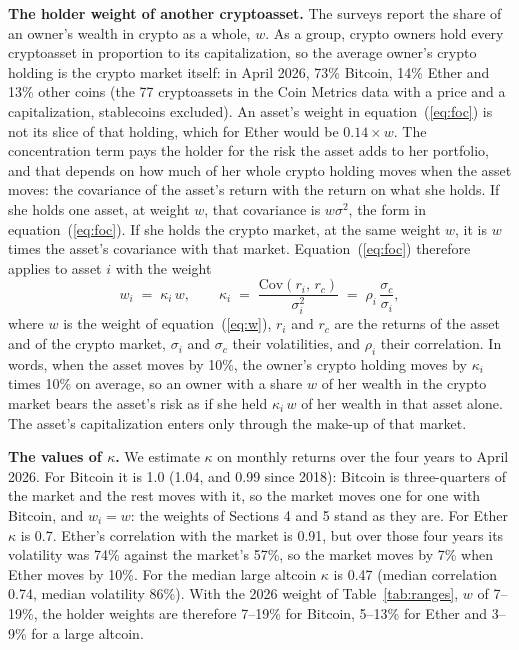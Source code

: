 \documentclass[11pt]{article}
\begin{document}
\textbf{The holder weight of another cryptoasset.} The surveys report the share of an owner's wealth in crypto as a whole, $w$. As a group, crypto owners hold every cryptoasset in proportion to its capitalization, so the average owner's crypto holding is the crypto market itself: in April 2026, 73\% Bitcoin, 14\% Ether and 13\% other coins (the 77 cryptoassets in the Coin Metrics data with a price and a capitalization, stablecoins excluded). An asset's weight in equation~(\ref{eq:foc}) is not its slice of that holding, which for Ether would be $0.14 \times w$. The concentration term pays the holder for the risk the asset adds to her portfolio, and that depends on how much of her whole crypto holding moves when the asset moves: the covariance of the asset's return with the return on what she holds. If she holds one asset, at weight $w$, that covariance is $w\sigma^2$, the form in equation~(\ref{eq:foc}). If she holds the crypto market, at the same weight $w$, it is $w$ times the asset's covariance with that market. Equation~(\ref{eq:foc}) therefore applies to asset $i$ with the weight
\begin{equation}
w_i \;=\; \kappa_i\,w, \qquad \kappa_i \;=\; \frac{\mathrm{Cov}(r_i,\, r_c)}{\sigma_i^{2}} \;=\; \rho_i\,\frac{\sigma_c}{\sigma_i},
\label{eq:kappa}
\end{equation}
where $w$ is the weight of equation~(\ref{eq:w}), $r_i$ and $r_c$ are the returns of the asset and of the crypto market, $\sigma_i$ and $\sigma_c$ their volatilities, and $\rho_i$ their correlation. In words, when the asset moves by 10\%, the owner's crypto holding moves by $\kappa_i$ times 10\% on average, so an owner with a share $w$ of her wealth in the crypto market bears the asset's risk as if she held $\kappa_i\,w$ of her wealth in that asset alone. The asset's capitalization enters only through the make-up of that market.

\textbf{The values of $\kappa$.} We estimate $\kappa$ on monthly returns over the four years to April 2026. For Bitcoin it is 1.0 (1.04, and 0.99 since 2018): Bitcoin is three-quarters of the market and the rest moves with it, so the market moves one for one with Bitcoin, and $w_i = w$: the weights of Sections 4 and 5 stand as they are. For Ether $\kappa$ is 0.7. Ether's correlation with the market is 0.91, but over those four years its volatility was 74\% against the market's 57\%, so the market moves by 7\% when Ether moves by 10\%. For the median large altcoin $\kappa$ is 0.47 (median correlation 0.74, median volatility 86\%). With the 2026 weight of Table~\ref{tab:ranges}, $w$ of 7--19\%, the holder weights are therefore 7--19\% for Bitcoin, 5--13\% for Ether and 3--9\% for a large altcoin.
\end{document}
